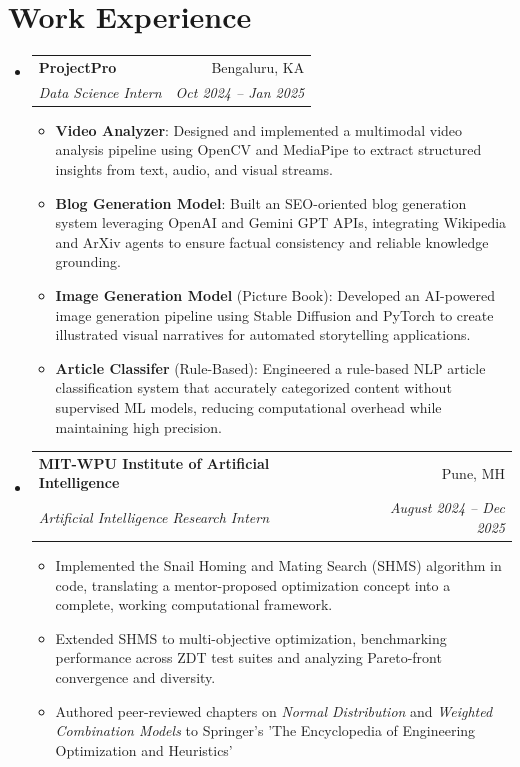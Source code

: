 \documentclass[letterpaper,11pt]{article}
\makeatletter
\newcommand{\resumeItemNH}[1]{
  \item\small{
    {#1 \vspace{-2pt}}
  }
}
\newcommand{\resumeSubheading}[4]{
  \vspace{-1pt}\item
    \begin{tabular*}{0.97\textwidth}{l@{\extracolsep{\fill}}r}
      \textbf{#1} & #2 \\
      \textit{\small#3} & \textit{\small #4} \\
    \end{tabular*}\vspace{-5pt}
}
\newcommand{\resumeSubHeadingListStart}{\begin{itemize}[leftmargin=*,label={}]}
\newcommand{\resumeSubHeadingListEnd}{\end{itemize}}
\newcommand{\resumeItemListStart}{\begin{itemize}}
\newcommand{\resumeItemListEnd}{\end{itemize}}
\makeatother
\begin{document}
\section{Work Experience}
  \resumeSubHeadingListStart
    \resumeSubheading
      {ProjectPro}{Bengaluru, KA}
      {Data Science Intern}{Oct 2024 -- Jan 2025}
      \resumeItemListStart
        \resumeItemNH{\textbf{Video Analyzer}: Designed and implemented a multimodal video analysis pipeline using OpenCV and MediaPipe to extract structured insights from text, audio, and visual streams.}
        \resumeItemNH{\textbf{Blog Generation Model}: Built an SEO-oriented blog generation system leveraging OpenAI and Gemini GPT APIs, integrating Wikipedia and ArXiv agents to ensure factual consistency and reliable knowledge grounding.}
        \resumeItemNH{\textbf{Image Generation Model} (Picture Book): Developed an AI-powered image generation pipeline using Stable Diffusion and PyTorch to create illustrated visual narratives for automated storytelling applications.}        
        \resumeItemNH{\textbf{Article Classifer} (Rule-Based): Engineered a rule-based NLP article classification system that accurately categorized content without supervised ML models, reducing computational overhead while maintaining high precision.}
      \resumeItemListEnd
    \resumeSubheading
      {MIT-WPU Institute of Artificial Intelligence}{Pune, MH}
      {Artificial Intelligence Research Intern}{August 2024 -- Dec 2025}
      \resumeItemListStart
        \resumeItemNH{Implemented the Snail Homing and Mating Search (SHMS) algorithm in code, translating a mentor-proposed optimization concept into a complete, working computational framework.}
        \resumeItemNH{Extended SHMS to multi-objective optimization, benchmarking performance across ZDT test suites and analyzing Pareto-front convergence and diversity.}
        \resumeItemNH{Authored peer-reviewed chapters on \textit{Normal Distribution} and \textit{Weighted Combination Models} to Springer's 'The Encyclopedia of Engineering Optimization and Heuristics'}
      \resumeItemListEnd
  \resumeSubHeadingListEnd

\end{document}
